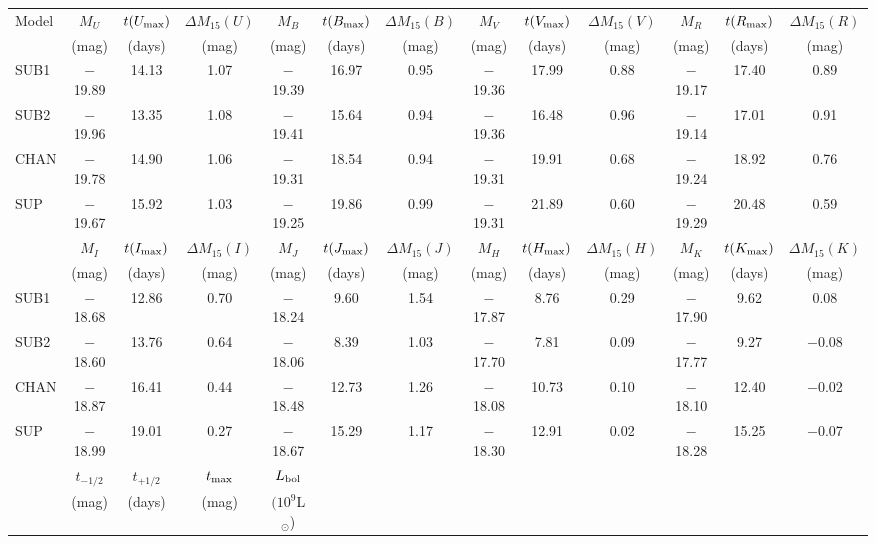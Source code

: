 \documentclass[useAMS,usenatbib,useasmath]{mnras}
\newcommand{\Lsun}{\hbox{L$_\odot$}}
\begin{document}
\begin{table*}
\begin{minipage}[t]{\linewidth}
\hspace*{-0.75cm}
 \begin{tabular}{| l  | c | c | c | c | c | c | c | c | c | c | c | c |} 
 \hline
 Model & $M_U$ & $t(U_{\rm max})$ & $\Delta M_{15}(U)$ & $M_B$ & $t(B_{\rm max})$ & $\Delta M_{15}(B)$ & $M_V$ & $t(V_{\rm max})$ & $\Delta M_{15}(V)$ & $M_R$ & $t(R_{\rm max})$ & $\Delta M_{15}(R)$ \\
 & (mag) & (days) & (mag) & (mag) & (days) & (mag)  & (mag) & (days) & (mag) & (mag) & (days) & (mag)  \\ [0.5ex]  \hline\hline
SUB1 & $-$19.89  & 14.13  &  1.07  & $-$19.39  & 16.97  &  0.95  & $-$19.36  & 17.99  &  0.88  & $-$19.17  & 17.40  &  0.89  \\
SUB2 & $-$19.96  & 13.35  &  1.08  & $-$19.41  & 15.64  &  0.94  & $-$19.36  & 16.48  &  0.96  & $-$19.14  & 17.01  &  0.91  \\
CHAN & $-$19.78  & 14.90  &  1.06  & $-$19.31  & 18.54  &  0.94  & $-$19.31  & 19.91  &  0.68  & $-$19.24  & 18.92  &  0.76  \\
SUP & $-$19.67  & 15.92  &  1.03  & $-$19.25  & 19.86  &  0.99  & $-$19.31  & 21.89  &  0.60  & $-$19.29  & 20.48  &  0.59  \\ \hline
& $M_I$ & $t(I_{\rm max})$ & $\Delta M_{15}(I)$ & $M_J$ & $t(J_{\rm max})$ & $\Delta M_{15}(J)$ & $M_H$ & $t(H_{\rm max})$ & $\Delta M_{15}(H)$ & $M_K$ & $t(K_{\rm max})$ & $\Delta M_{15}(K)$ \\
& (mag) & (days) & (mag) & (mag) & (days) & (mag) & (mag) & (days) & (mag) & (mag) & (days) & (mag) \\ \hline\hline
SUB1 & $-$18.68  & 12.86  &  0.70  & $-$18.24  &  9.60  &  1.54  & $-$17.87  &  8.76  &  0.29  & $-$17.90  &  9.62  &  0.08  \\
SUB2 & $-$18.60  & 13.76  &  0.64  & $-$18.06  &  8.39  &  1.03  & $-$17.70  &  7.81  &  0.09  & $-$17.77  &  9.27  & $-$0.08  \\
CHAN & $-$18.87  & 16.41  &  0.44  & $-$18.48  & 12.73  &  1.26  & $-$18.08  & 10.73  &  0.10  & $-$18.10  & 12.40  & $-$0.02  \\
SUP & $-$18.99  & 19.01  &  0.27  & $-$18.67  & 15.29  &  1.17  & $-$18.30  & 12.91  &  0.02  & $-$18.28  & 15.25  & $-$0.07  \\ \hline
& $t_{-1/2}$ & $t_{+1/2}$ & $t_{\rm max}$ & $L_{\rm bol}$ \\
& (mag) & (days) & (mag) & $(10^9$\Lsun) \\ \hline\hline %

\end{tabular}
\end{minipage}
\end{table*}
\end{document}
